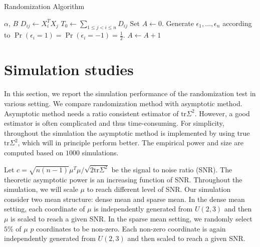 \documentclass[review]{elsarticle}
\theoremstyle{plain}
\theoremstyle{definition}
\theoremstyle{remark}
\begin{document}






\begin{algorithm}
    \caption{Randomization Algorithm}
\label{theAlgorithm}
    \begin{algorithmic}
        \REQUIRE  $\alpha$, $B$
            \STATE $D_{ij}\gets X_i^T X_j$
        \ENDFOR
        \STATE $T_0\gets \sum_{1\leq j<i\leq n}D_{ij}$
        \STATE Set $A\gets 0$.
            \STATE Generate $\epsilon_1,\ldots,\epsilon_n$ according to $\Pr(\epsilon_i=1)=\Pr(\epsilon_i=-1)=\frac{1}{2}$.
            \STATE $A\gets A+1$
                \ENDIF
        \ELSE
            \ENDIF
            \ENDIF
        \ENDFOR
    \end{algorithmic}
\end{algorithm}

\section{Simulation studies}
In this section, we report the simulation performance of the randomization test in various setting.
We compare randomization method with asymptotic method.
Asymptotic method needs a ratio consistent estimator of $\mathrm{tr}\Sigma^2$.
However, a good estimator is often complicated and thus time-consuming. For simplicity, throughout the simulation the asymptotic method is implemented by using true $\mathrm{tr}\Sigma^2$, which will in principle perform better.
The empirical power and size are computed based on $1000$ simulations.


Let $c=\sqrt{n(n-1)}\mu^T \mu /\sqrt{2\mathrm{tr}\Sigma^2}$ be the signal to noise ratio (SNR).
The theoretic asymptotic power is an increasing function of SNR\@.
Throughout the simulation, we will scale $\mu$ to reach different level of SNR\@.
Our simulation consider two mean structure: dense mean and sparse mean.
In the dense mean setting, each coordinate of $\mu$ is independently generated from $U(2,3)$ and then $\mu$ is scaled to reach a given SNR\@.
In the sparse mean setting, we randomly select $5\%$ of $\mu$ $p$ coordinates to be non-zero.
Each non-zero coordinate is again independently generated from $U(2,3)$ and then scaled to reach a given SNR\@.
\end{document}
